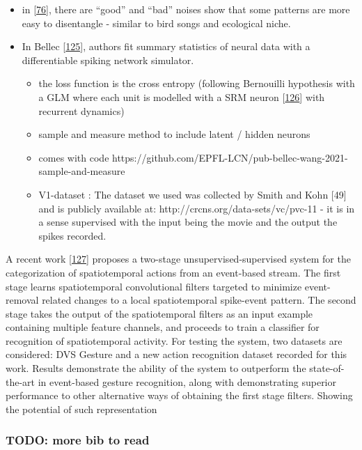 \begin{itemize}
\item
  in {[}\protect\hyperlink{ref-Jzr1gwsr}{76}{]}, there are ``good'' and ``bad'' noises show that some patterns are more easy to disentangle - similar to bird songs and ecological niche.
\item
  In Bellec {[}\protect\hyperlink{ref-aj6TgorR}{125}{]}, authors fit summary statistics of neural data with a differentiable spiking network simulator.

  \begin{itemize}
  \tightlist
  \item
    the loss function is the cross entropy (following Bernouilli hypothesis with a GLM where each unit is modelled with a SRM neuron {[}\protect\hyperlink{ref-14e3BCBii}{126}{]} with recurrent dynamics)
  \item
    sample and measure method to include latent / hidden neurons
  \item
    comes with code https://github.com/EPFL-LCN/pub-bellec-wang-2021-sample-and-measure
  \item
    V1-dataset : The dataset we used was collected by Smith and Kohn {[}49{]} and is publicly available at:
    http://crcns.org/data-sets/vc/pvc-11 - it is in a sense supervised with the input being the movie and the output the spikes recorded.
  \end{itemize}
\end{itemize}

A recent work {[}\protect\hyperlink{ref-10EU8MfxC}{127}{]} proposes a two-stage unsupervised-supervised system for the categorization of spatiotemporal actions from an event-based stream. The first stage learns spatiotemporal convolutional filters targeted to minimize event-removal related changes to a local spatiotemporal spike-event pattern. The second stage takes the output of the spatiotemporal filters as an input example containing multiple feature channels, and proceeds to train a classifier for recognition of spatiotemporal activity. For testing the system, two datasets are considered: DVS Gesture and a new action recognition dataset recorded for this work. Results demonstrate the ability of the system to outperform the state-of-the-art in event-based gesture recognition, along with demonstrating superior performance to other alternative ways of obtaining the first stage filters. Showing the potential of such representation

\hypertarget{todo-more-bib-to-read}{%
\subsubsection{TODO: more bib to read}\label{todo-more-bib-to-read}}

